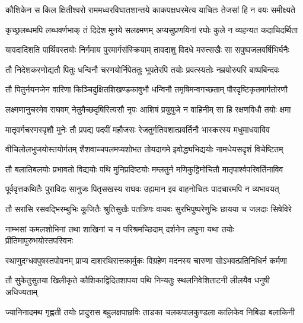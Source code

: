 \fourlineindentedshloka
{कौशिकेन स किल क्षितीश्वरो}
{राममध्वरविघातशान्तये}
{काकपक्षधरमेत्य याचितः}
{तेजसां हि न वयः समीक्ष्यते} %

\fourlineindentedshloka
{कृच्छ्रलब्धमपि लब्धवर्णभाक्}
{तं दिदेश मुनये सलक्ष्मणम्}
{अप्यसुप्रणयिनां रघोः कुले}
{न व्यहन्यत कदाचिदर्थिता} %

\fourlineindentedshloka
{यावदादिशति पार्थिवस्तयोः}
{निर्गमाय पुरमार्गसंस्क्रियाम्}
{तावदाशु विदधे मरुत्सखैः}
{सा सपुष्पजलवर्षिभिर्घनैः} %

\fourlineindentedshloka
{तौ निदेशकरणोद्यतौ पितुः}
{धन्विनौ चरणयोर्निपेततुः}
{भूपतेरपि तयोः प्रवत्स्यतोः}
{नम्रयोरुपरि बाष्पबिन्दवः} %

\fourlineindentedshloka
{तौ पितुर्नयनजेन वारिणा}
{किञ्चिदुक्षितशिखण्डकावुभौ}
{धन्विनौ तमृषिमन्वगच्छताम्}
{पौरदृष्टिकृतमार्गतोरणौ} %

\fourlineindentedshloka
{लक्ष्मणानुचरमेव राघवम्}
{नेतुमैच्छदृषिरित्यसौ नृपः}
{आशिषं प्रयुयुजे न वाहिनीम्}
{सा हि रक्षणविधौ तयोः क्षमा} %

\fourlineindentedshloka
{मातृवर्गचरणस्पृशौ मुनेः}
{तौ प्रपद्य पदवीं महौजसः}
{रेजतुर्गतिवशात्प्रवर्तिनौ}
{भास्करस्य मधुमाधवाविव} %

\fourlineindentedshloka
{वीचिलोलभुजयोस्तयोर्गतम्}
{शैशवाच्चपलमप्यशोभत}
{तोयदागमे इवोद्ध्यभिद्ययोः}
{नामधेयसदृशं विचेष्टितम्} %

\fourlineindentedshloka
{तौ बलातिबलयोः प्रभावतो}
{विद्ययोः पथि मुनिप्रदिष्टयोः}
{मम्लतुर्न मणिकुट्टिमोचितौ}
{मातृपार्श्वपरिवर्तिनाविव} %

\fourlineindentedshloka
{पूर्ववृत्तकथितैः पुराविदः}
{सानुजः पितृसखस्य राघवः}
{उह्यमान इव वाहनोचितः}
{पादचारमपि न व्यभावयत्} %

\fourlineindentedshloka
{तौ सरांसि रसवद्भिरम्बुभिः}
{कूजितैः श्रुतिसुखैः पतत्रिणः}
{वायवः सुरभिपुष्परेणुभिः}
{छायया च जलदाः सिषेविरे} %

\fourlineindentedshloka
{नाम्भसां कमलशोभिनां तथा}
{शाखिनां च न परिश्रमच्छिदाम्}
{दर्शनेन लघुना यथा तयोः}
{प्रीतिमापुरुभयोस्तपस्विनः} %

\fourlineindentedshloka
{स्थाणुदग्धवपुषस्तपोवनम्}
{प्राप्य दाशरथिरात्तकार्मुकः}
{विग्रहेण मदनस्य चारुणा}
{सोऽभवत्प्रतिनिधिर्न कर्मणा} %

\fourlineindentedshloka
{तौ सुकेतुसुतया खिलीकृते}
{कौशिकाद्विदितशापया पथि}
{निन्यतुः स्थलनिवेशिताटनी}
{लीलयैव धनुषी अधिज्यताम्} %

\fourlineindentedshloka
{ज्यानिनादमथ गृह्णती तयोः}
{प्रादुरास बहुलक्षपाछविः}
{ताडका चलकपालकुण्डला}
{कालिकेव निबिडा बलाकिनी} %

